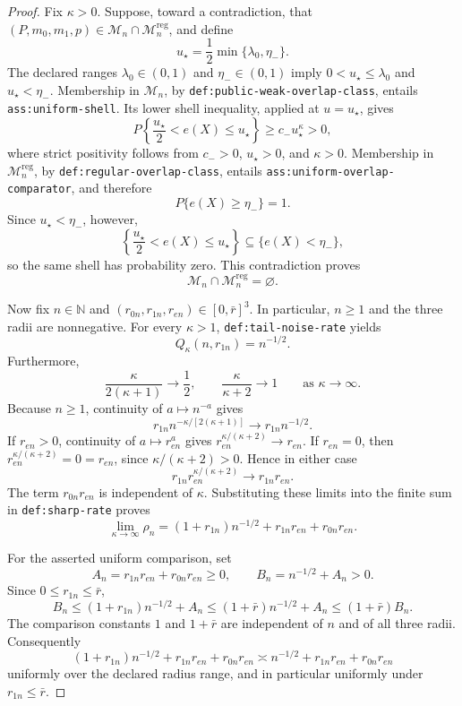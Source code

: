 \documentclass{article}
\begin{document}
\begin{proof}
Fix \(\kappa>0\).  Suppose, toward a contradiction, that
\((P,m_0,m_1,p)\in\mathcal M_n\cap\mathcal M_n^{\mathrm{reg}}\), and define
\[
u_\star=\frac12\min\{\lambda_0,\eta_-\}.
\]
The declared ranges \(\lambda_0\in(0,1)\) and \(\eta_-\in(0,1)\) imply
\(0<u_\star\le\lambda_0\) and \(u_\star<\eta_-\).  Membership in
\(\mathcal M_n\), by \texttt{def:public-weak-overlap-class}, entails
\texttt{ass:uniform-shell}.  Its lower shell inequality, applied at
\(u=u_\star\), gives
\[
P\!\left\{\frac{u_\star}{2}<e(X)\le u_\star\right\}
\ge c_-u_\star^\kappa>0,
\]
where strict positivity follows from \(c_->0\), \(u_\star>0\), and
\(\kappa>0\).  Membership in \(\mathcal M_n^{\mathrm{reg}}\), by
\texttt{def:regular-overlap-class}, entails
\texttt{ass:uniform-overlap-comparator}, and therefore
\[
P\{e(X)\ge\eta_-\}=1.
\]
Since \(u_\star<\eta_-\), however,
\[
\left\{\frac{u_\star}{2}<e(X)\le u_\star\right\}
\subseteq\{e(X)<\eta_-\},
\]
so the same shell has probability zero.  This contradiction proves
\[
\mathcal M_n\cap\mathcal M_n^{\mathrm{reg}}=\varnothing.
\]

Now fix \(n\in\mathbb N\) and
\((r_{0n},r_{1n},r_{en})\in[0,\bar r]^3\).  In particular, \(n\ge1\) and
the three radii are nonnegative.  For every \(\kappa>1\),
\texttt{def:tail-noise-rate} yields
\[
Q_\kappa(n,r_{1n})=n^{-1/2}.
\]
Furthermore,
\[
\frac{\kappa}{2(\kappa+1)}\longrightarrow\frac12,
\qquad
\frac{\kappa}{\kappa+2}\longrightarrow1
\qquad\text{as }\kappa\to\infty.
\]
Because \(n\ge1\), continuity of \(a\mapsto n^{-a}\) gives
\[
r_{1n}n^{-\kappa/[2(\kappa+1)]}
\longrightarrow r_{1n}n^{-1/2}.
\]
If \(r_{en}>0\), continuity of \(a\mapsto r_{en}^{a}\) gives
\(r_{en}^{\kappa/(\kappa+2)}\to r_{en}\).  If \(r_{en}=0\), then
\(r_{en}^{\kappa/(\kappa+2)}=0=r_{en}\), since
\(\kappa/(\kappa+2)>0\).  Hence in either case
\[
r_{1n}r_{en}^{\kappa/(\kappa+2)}
\longrightarrow r_{1n}r_{en}.
\]
The term \(r_{0n}r_{en}\) is independent of \(\kappa\).  Substituting these
limits into the finite sum in \texttt{def:sharp-rate} proves
\[
\lim_{\kappa\to\infty}\rho_n
=(1+r_{1n})n^{-1/2}+r_{1n}r_{en}+r_{0n}r_{en}.
\]

For the asserted uniform comparison, set
\[
A_n=r_{1n}r_{en}+r_{0n}r_{en}\ge0,
\qquad
B_n=n^{-1/2}+A_n>0.
\]
Since \(0\le r_{1n}\le\bar r\),
\[
B_n
\le (1+r_{1n})n^{-1/2}+A_n
\le (1+\bar r)n^{-1/2}+A_n
\le (1+\bar r)B_n.
\]
The comparison constants \(1\) and \(1+\bar r\) are independent of \(n\)
and of all three radii.  Consequently
\[
(1+r_{1n})n^{-1/2}+r_{1n}r_{en}+r_{0n}r_{en}
\asymp n^{-1/2}+r_{1n}r_{en}+r_{0n}r_{en}
\]
uniformly over the declared radius range, and in particular uniformly under
\(r_{1n}\le\bar r\).


\end{proof}
\end{document}
